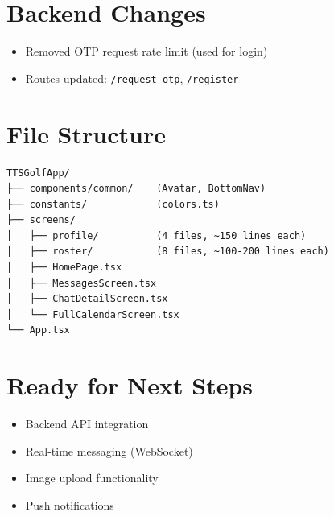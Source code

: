 \documentclass[11pt,a4paper]{article}
\begin{document}
\section{Backend Changes}
\begin{itemize}[noitemsep]
    \item Removed OTP request rate limit (used for login)
    \item Routes updated: \texttt{/request-otp}, \texttt{/register}
\end{itemize}

\section{File Structure}
\begin{verbatim}
TTSGolfApp/
├── components/common/    (Avatar, BottomNav)
├── constants/            (colors.ts)
├── screens/
│   ├── profile/          (4 files, ~150 lines each)
│   ├── roster/           (8 files, ~100-200 lines each)
│   ├── HomePage.tsx
│   ├── MessagesScreen.tsx
│   ├── ChatDetailScreen.tsx
│   └── FullCalendarScreen.tsx
└── App.tsx
\end{verbatim}

\section{Ready for Next Steps}
\begin{itemize}[noitemsep]
    \item Backend API integration
    \item Real-time messaging (WebSocket)
    \item Image upload functionality
    \item Push notifications
\end{itemize}
\end{document}
